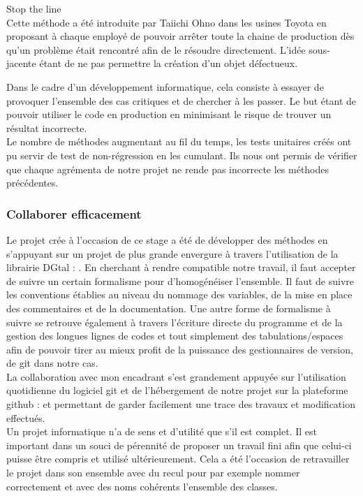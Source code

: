 \begin{Definition}{Stop the line}\\
\label{def:stopthline}
   Cette méthode a été introduite par Taiichi Ohno dans les usines Toyota en proposant à chaque employé de pouvoir arrêter toute la chaine de production dès qu'un problème était rencontré afin de le résoudre directement. L'idée sous-jacente étant de ne pas permettre la création d'un objet défectueux.
\end{Definition}

Dans le cadre d'un développement informatique, cela consiste à essayer de provoquer l'ensemble des cas critiques et de chercher à les passer. Le but étant de pouvoir utiliser le code en production en minimisant le risque de trouver un résultat incorrecte.\\


Le nombre de méthodes augmentant au fil du temps, les tests unitaires créés ont pu servir de test de non-régression en les cumulant. Ils nous ont permis de vérifier que chaque agrémenta de notre projet ne rende pas incorrecte les méthodes précédentes.\\


\subsubsection{Collaborer efficacement}

Le projet crée à l'occasion de ce stage a été de développer des méthodes en s'appuyant sur un projet de plus grande envergure à travers l'utilisation de la librairie DGtal : \cite{DGtal}. En cherchant à rendre compatible notre travail, il faut accepter de suivre un certain formalisme pour d'homogénéiser l'ensemble. Il faut de suivre les conventions établies au niveau du nommage des variables, de la mise en place des commentaires et de la documentation. Une autre forme de formalisme à suivre se retrouve également à travers l'écriture directe du programme et de la gestion des longues lignes de codes et tout simplement des tabulations/espaces afin de pouvoir tirer au mieux profit de la puissance des gestionnaires de version, de git dans notre cas.\\

La collaboration avec mon encadrant s'est grandement appuyée sur l'utilisation quotidienne du logiciel git et de l’hébergement de notre projet sur la plateforme github : \cite{github-tristan} et \cite{github-thomas} permettant de garder facilement une trace des travaux et modification effectués.\\

Un projet informatique n'a de sens et d'utilité que s'il est complet. Il est important dans un souci de pérennité de proposer un travail fini afin que celui-ci puisse être compris et utilisé ultérieurement. Cela a été l’occasion de retravailler le projet dans son ensemble avec du recul pour par exemple nommer correctement et avec des noms cohérents l'ensemble des classes.


